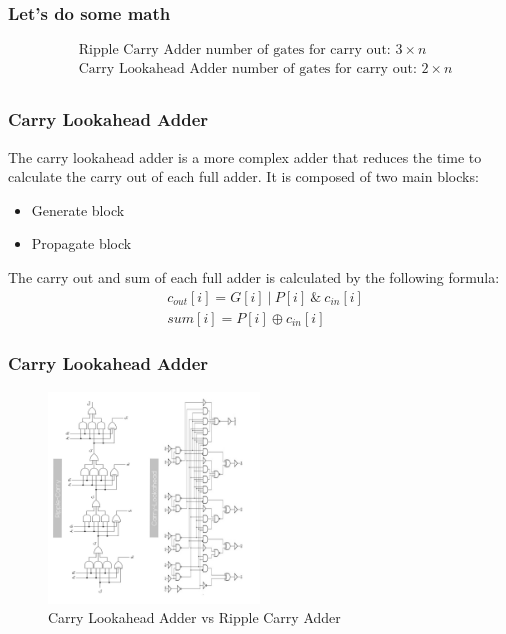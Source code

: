 \begin{frame}
    \frametitle{Let's do some math}
    \begin{equation}
        \begin{aligned}
            & \text{Ripple Carry Adder number of gates for carry out: } 3 \times n\\
            & \text{Carry Lookahead Adder number of gates for carry out: } 2 \times n\\
        \end{aligned}
    \end{equation}
\end{frame}


\begin{frame}
    \frametitle{Carry Lookahead Adder}
    The carry lookahead adder is a more complex adder that reduces the time to calculate the carry out of each full adder. It is composed of two main blocks:
    \begin{itemize}
        \item Generate block
        \item Propagate block
    \end{itemize}
    The carry out and sum of each full adder is calculated by the following formula:
    \begin{equation}
        \begin{aligned}
            &c_{out}[i]=G[i] \ | \ P[i] \ \& \ c_{in}[i]\\
            &sum[i]=P[i] \oplus c_{in}[i]
        \end{aligned}
    \end{equation}

\end{frame}

\begin{frame}
    \frametitle{Carry Lookahead Adder}
    \begin{figure}
        \centering
        \includegraphics[width=0.5\textwidth, angle=270 ]{media/adders_comparison.jpg}
        \caption{Carry Lookahead Adder vs Ripple Carry Adder}
    \end{figure}
\end{frame}

